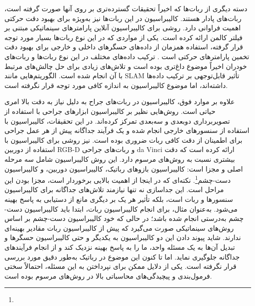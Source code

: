 دسته دیگری از ربات‌ها که اخیراً تحقیقات گسترده‌تری بر روی آنها صورت گرفته است، ربات‌های پادار هستند. کالیبراسیون در این ربات‌ها نیز به‌ویژه برای بهبود دقت حرکتی اهمیت فراوانی دارد. \cite{yang2022online} روشی برای کالیبراسیون آنلاین پارامترهای سینماتیکی مبتنی بر فیلتر کالمن ارائه کرده است. یکی از مواردی که در این نوع ربات‌ها بسیار مورد توجه قرار گرفته، استفاده همزمان از داده‌های حسگرهای داخلی و خارجی برای بهبود دقت تخمین پارامترهای حرکتی است \cite{blochliger2017foot}. ترکیب داده‌های مختلف در این نوع ربات‌ها و ربات‌های خودران اخیراً موضوع داغ‌تری بوده است و تلاش‌های زیادی برای حل چالش‌های مرتبط با آن انجام شده است. الگوریتم‌هایی مانند SLAM تأثیر قابل‌توجهی بر ترکیب داده‌ها داشته‌اند، اما موضوع کالیبراسیون به اندازه کافی مورد توجه قرار نگرفته است.

علاوه بر موارد فوق، کالیبراسیون در ربات‌های جراح به دلیل نیاز به دقت بالا امری حیاتی است. روش‌هایی نظیر \cite{wang2017vision} بر کالیبراسیون ابزارهای جراحی با استفاده از تصویربرداری دوبعدی و سه‌بعدی تمرکز کرده‌اند. در این تحقیقات، کالیبراسیون با استفاده از سنسورهای خارجی انجام شده و یک فرآیند جداگانه پیش از هر عمل جراحی برای اطمینان از دقت کافی ربات ضروری بوده است. \cite{roberti2020improving} نیز روشی برای کالیبراسیون با استفاده از دوربین RGB-D و ربات‌های جراحی da Vinci ارائه کرده است که دقت بیشتری نسبت به روش‌های مرسوم دارد. این روش کالیبراسیون شامل سه مرحله اصلی و مجزا است: کالیبراسیون بازوهای رباتیک، کالیبراسیون دوربین، و کالیبراسیون دست-چشم\footnote{}.
نکته‌ای که در اینجا از اهمیت بالایی برخوردار است، مجزا بودن این مراحل است. این جداسازی نه تنها نیازمند تلاش‌های جداگانه برای کالیبراسیون سنسورها و ربات است، بلکه تأثیر هر یک بر دیگری مانع از دستیابی به پاسخ بهینه می‌شود. به‌عنوان مثال، برای انجام کالیبراسیون ربات، ابتدا باید کالیبراسیون دست-چشم به‌درستی انجام شده باشد؛ در حالی که خود کالیبراسیون دست-چشم بر اساس روش‌های سینماتیکی صورت می‌گیرد که پیش از کالیبراسیون ربات مقادیر بهینه‌ای ندارند. شاید پیوند دادن این دو کالیبراسیون به یکدیگر و حتی کالیبراسیون حسگرها و تبدیل آن‌ها به یک مسئله واحد، ما را به پاسخ بهینه نزدیک کند و از انجام فرآیندهای جداگانه جلوگیری نماید. اما تا کنون این موضوع در رباتیک به‌طور دقیق مورد بررسی قرار نگرفته است. یکی از دلایل ممکن برای نپرداختن به این مسئله، احتمالاً سختی فرمول‌بندی و پیچیدگی‌های محاسباتی بالا در روش‌های مرسوم بوده است. 


